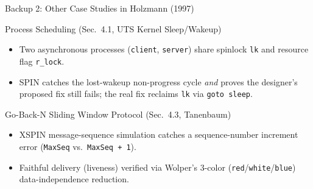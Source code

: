 \documentclass[aspectratio=169]{beamer}
\begin{document}
\begin{frame}[label=backup2]{Backup 2: Other Case Studies in Holzmann (1997)}
  \begin{block}{Process Scheduling (Sec.\ 4.1, UTS Kernel Sleep/Wakeup)}
    \begin{itemize}
      \item Two asynchronous processes (\texttt{client}, \texttt{server}) share spinlock \texttt{lk} and resource flag \texttt{r\_lock}.
      \item SPIN catches the lost-wakeup non-progress cycle \emph{and} proves the designer's proposed fix still fails; the real fix reclaims \texttt{lk} via \texttt{goto sleep}.
    \end{itemize}
  \end{block}
  \vspace{0.3em}
  \begin{block}{Go-Back-N Sliding Window Protocol (Sec.\ 4.3, Tanenbaum)}
    \begin{itemize}
      \item XSPIN message-sequence simulation catches a sequence-number increment error (\texttt{MaxSeq} vs.\ \texttt{MaxSeq + 1}).
      \item Faithful delivery (liveness) verified via Wolper's 3-color (\texttt{red}/\texttt{white}/\texttt{blue}) data-independence reduction.
    \end{itemize}
  \end{block}
  \vspace{0.5em}
  \hfill\hyperlink{qa}{}
\end{frame}
\end{document}
